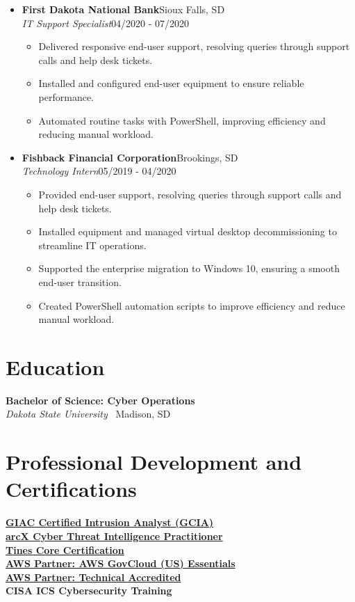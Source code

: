 \documentclass[letterpaper,9pt]{extarticle}
\newcommand{\resumeSubheading}[4]{%
  \vspace{0.2em}%
  \textbf{#1}\hfill{\small #2}\\[-0.1em]
  {\small\textit{#3} \textbar\ {\color{muted}#4}}%
}
\newcommand{\resumeCompany}[2]{%
  \vspace{0.2em}%
  \textbf{#1}\hfill{\small\color{muted}#2}\\[0.2em]%
}
\newcommand{\resumePosition}[2]{%
  {\small\textit{#1}}\hfill{\small #2}%
}
\newcommand{\resumeItem}[1]{\item\small #1}
\begin{document}
\begin{itemize}[leftmargin=0pt, label={}, itemsep=0.35em]
  \item
  \resumeCompany{First Dakota National Bank}{Sioux Falls, SD}
  \resumePosition{IT Support Specialist}{04/2020 - 07/2020}
  \begin{itemize}
    \resumeItem{Delivered responsive end-user support, resolving queries through support calls and help desk tickets.}
    \resumeItem{Installed and configured end-user equipment to ensure reliable performance.}
    \resumeItem{Automated routine tasks with PowerShell, improving efficiency and reducing manual workload.}
  \end{itemize}

  \item
  \resumeCompany{Fishback Financial Corporation}{Brookings, SD}
  \resumePosition{Technology Intern}{05/2019 - 04/2020}
  \begin{itemize}
    \resumeItem{Provided end-user support, resolving queries through support calls and help desk tickets.}
    \resumeItem{Installed equipment and managed virtual desktop decommissioning to streamline IT operations.}
    \resumeItem{Supported the enterprise migration to Windows 10, ensuring a smooth end-user transition.}
    \resumeItem{Created PowerShell automation scripts to improve efficiency and reduce manual workload.}
  \end{itemize}

\end{itemize}

\section*{Education}
\resumeSubheading{Bachelor of Science: Cyber Operations}{}{Dakota State University}{Madison, SD}

\section*{Professional Development and Certifications}
\small
\href{https://www.credly.com/badges/87563fff-910c-449c-ab21-f571b162cd4b/public_url}{\textbf{GIAC Certified Intrusion Analyst (GCIA)}}\\
\href{https://arcx.io/verify-certificate?id=2991f7743ca358a0f528c32e6685a7f68ffcd332&k=387d43ca09294cb6a13b2ed95eccb859}{\textbf{arcX Cyber Threat Intelligence Practitioner}}\\
\href{https://certification.tines.com/certificate/qTQkd1xZ7Q}{\textbf{Tines Core Certification}}\\
\href{https://www.credly.com/badges/f1f32bab-c511-4114-b884-e69ae2506275/public_url}{\textbf{AWS Partner: AWS GovCloud (US) Essentials}}\\
\href{https://www.credly.com/badges/4c4eef78-ec4f-4911-ae68-dc4a4c811ba2/public_url}{\textbf{AWS Partner: Technical Accredited}}\\
\textbf{CISA ICS Cybersecurity Training}
\end{document}
